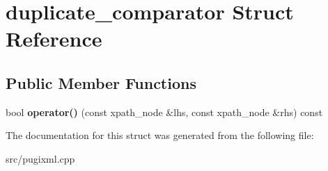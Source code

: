 \hypertarget{structduplicate__comparator}{}\section{duplicate\+\_\+comparator Struct Reference}
\label{structduplicate__comparator}
\subsection*{Public Member Functions}
\begin{DoxyCompactItemize}
\item 
\mbox{\label{structduplicate__comparator_adb22d41288a4313809c5f23a9b796e42}} 
bool {\bfseries operator()} (const xpath\+\_\+node \&lhs, const xpath\+\_\+node \&rhs) const
\end{DoxyCompactItemize}


The documentation for this struct was generated from the following file\+:\begin{DoxyCompactItemize}
\item 
src/pugixml.\+cpp\end{DoxyCompactItemize}
